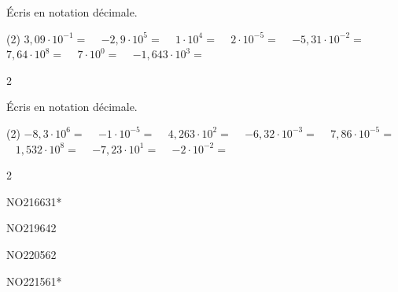 \documentclass[a4paper,11pt]{report}
\begin{document}
\begin{exop}{
Écris en notation décimale.

\begin{tasks}(2)
        \task $3,09\cdot10^{-1}=$ \hrulefill~
        \task $-2,9\cdot10^{5}=$ \hrulefill~
        \task $1\cdot10^{4}=$ \hrulefill~
        \task $2\cdot10^{-5}=$ \hrulefill~
        \task $-5,31\cdot10^{-2}=$ \hrulefill~
        \task $7,64\cdot10^{8}=$ \hrulefill~
        \task $7\cdot10^{0}=$ \hrulefill~
        \task $-1,643\cdot10^{3}=$ \hrulefill~
    \end{tasks}
}{2}
\end{exop}

\begin{exop}{
Écris en notation décimale.

\begin{tasks}(2)
        \task $-8,3\cdot10^{6}=$ \hrulefill~
        \task $-1\cdot10^{-5}=$ \hrulefill~
        \task $4,263\cdot10^{2}=$ \hrulefill~
        \task $-6,32\cdot10^{-3}=$ \hrulefill~
        \task $7,86\cdot10^{-5}=$ \hrulefill~
        \task $1,532\cdot10^{8}=$ \hrulefill~
        \task $-7,23\cdot10^{1}=$ \hrulefill~
        \task $-2\cdot10^{-2}=$ \hrulefill~
    \end{tasks}
}{2}
\end{exop}

\begin{exof}{NO216}{63}{1*} %
\end{exof}

\begin{exof}{NO219}{64}{2} %
\end{exof}

\begin{exol}{NO220}{56}{2} %
\end{exol}

\begin{exol}{NO221}{56}{1*} %
\end{exol}
\end{document}
